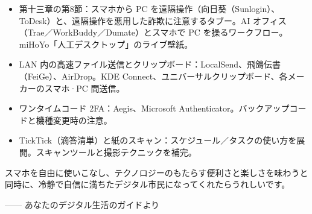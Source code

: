 
\begin{itemize}
  \item 第十三章の第8節：スマホから PC を遠隔操作（向日葵（Sunlogin）、ToDesk）と、遠隔操作を悪用した詐欺に注意するタブー。AI オフィス（Trae／WorkBuddy／Dumate）とスマホで PC を操るワークフロー。miHoYo「人工デスクトップ」のライブ壁紙。
  \item LAN 内の高速ファイル送信とクリップボード：LocalSend、飛鴿伝書（FeiGe）、AirDrop。KDE Connect、ユニバーサルクリップボード、各メーカーのスマホ·PC 間送信。
  \item ワンタイムコード 2FA：Aegis、Microsoft Authenticator。バックアップコードと機種変更時の注意。
  \item TickTick（滴答清単）と紙のスキャン：スケジュール／タスクの使い方を展開。スキャンツールと撮影テクニックを補完。
\end{itemize}

スマホを自由に使いこなし、テクノロジーのもたらす便利さと楽しさを味わうと同時に、冷静で自信に満ちたデジタル市民になってくれたらうれしいです。

—— あなたのデジタル生活のガイドより
